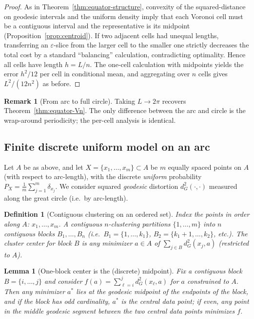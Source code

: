 \documentclass[12pt, reqno]{amsart}
\theoremstyle{plain}
\newtheorem{lemma}[subsection]{Lemma}
\newtheorem{defi}[subsection]{Definition}
\theoremstyle{definition}
\newtheorem{remark1}[subsubsection]{Remark}
\begin{document}
\begin{proof}
As in Theorem~\ref{thm:equator-structure}, convexity of the squared-distance on geodesic intervals and the uniform density imply that each Voronoi cell must be a contiguous interval and the representative is its midpoint (Proposition~\ref{prop:centroid}). If two adjacent cells had unequal lengths, transferring an $\varepsilon$-slice from the larger cell to the smaller one strictly decreases the total cost by a standard ``balancing'' calculation, contradicting optimality. Hence all cells have length $h=L/n$. The one-cell calculation with midpoints yields the error $h^2/12$ per cell in conditional mean, and aggregating over $n$ cells gives $L^2/(12n^2)$ as before.
\end{proof}

\begin{remark1}[From arc to full circle]
Taking $L\to 2\pi$ recovers Theorem~\ref{thm:equator-Vn}. The only difference between the arc and circle is the wrap-around periodicity; the per-cell analysis is identical.
\end{remark1}


\subsection{Finite discrete uniform model on an arc}\label{subsec:discrete}
Let $A$ be as above, and let $X=\{x_1,\dots,x_m\}\subset A$ be $m$ equally spaced points on $A$ (with respect to arc-length), with the discrete \emph{uniform} probability $P_X=\frac{1}{m}\sum_{j=1}^m \delta_{x_j}$. We consider squared \emph{geodesic} distortion $d_G^2(\cdot,\cdot)$ measured along the great circle (i.e.\ by arc-length).

\begin{defi}[Contiguous clustering on an ordered set]
Index the points in order along $A$: $x_1,\dots,x_m$. A \emph{contiguous $n$-clustering} partitions $\{1,\dots,m\}$ into $n$ contiguous blocks $B_1,\dots,B_n$ (i.e.\ $B_1=\{1,\dots,k_1\}$, $B_2=\{k_1+1,\dots,k_2\}$, etc.). The \emph{cluster center} for block $B$ is any minimizer $a\in A$ of $\sum_{j\in B} d_G^2(x_j,a)$ (restricted to $A$).
\end{defi}

\begin{lemma}[One-block center is the (discrete) midpoint]\label{lem:block-mid}
Fix a contiguous block $B=\{i,\dots,j\}$ and consider $f(a)=\sum_{\ell=i}^j d_G^2(x_\ell,a)$ for $a$ constrained to $A$. Then any minimizer $a^\ast$ lies at the \emph{geodesic midpoint} of the endpoints of the block, and if the block has odd cardinality, $a^\ast$ is the central data point; if even, any point in the middle geodesic segment between the two central data points minimizes $f$.
\end{lemma}
\end{document}
